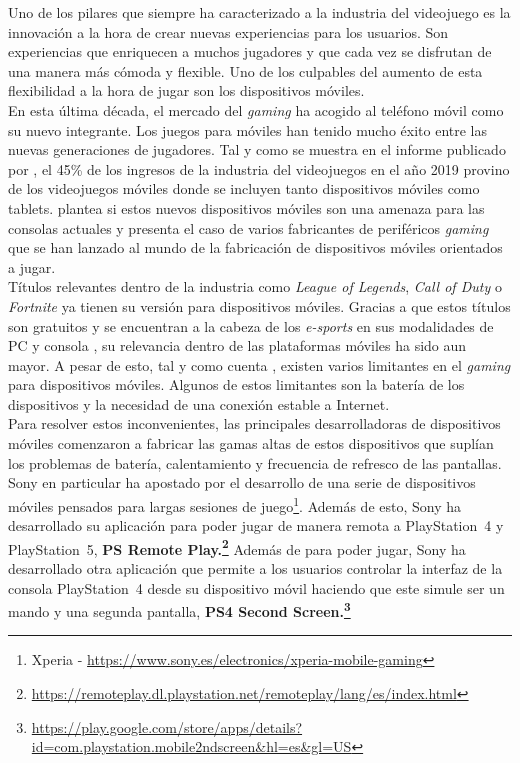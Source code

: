 Uno de los pilares que siempre ha caracterizado a la industria del videojuego es la innovaci\'on a la hora de crear nuevas experiencias para los usuarios. Son experiencias que enriquecen a muchos jugadores y que cada vez se disfrutan de una manera m\'as c\'omoda y flexible. Uno de los culpables del aumento de esta flexibilidad a la hora de jugar son los dispositivos m\'oviles. \\

En esta \'ultima d\'ecada, el mercado del \textit{gaming} ha acogido al tel\'efono m\'ovil como su nuevo integrante. Los juegos para m\'oviles han tenido mucho \'exito entre las nuevas generaciones de jugadores. Tal y como se muestra en el informe publicado por \cite{AEVI2019}, el 45\% de los ingresos de la industria del videojuegos en el a\~no 2019 provino de los videojuegos m\'oviles donde se incluyen tanto dispositivos m\'oviles como tablets. \cite{moviles} plantea si estos nuevos dispositivos m\'oviles son una amenaza para las consolas actuales y presenta el caso de varios fabricantes de perif\'ericos \textit{gaming} que se han lanzado al mundo de la fabricaci\'on de dispositivos m\'oviles orientados a jugar. \\

T\'itulos relevantes dentro de la industria como \textit{League of Legends}, \textit{Call of Duty} o \textit{Fortnite} ya tienen su versi\'on para dispositivos m\'oviles. Gracias a que estos t\'itulos son gratuitos y se encuentran a la cabeza de los \textit{e-sports} en sus modalidades de PC y consola \citep*{TEOQ32020}, su relevancia dentro de las plataformas m\'oviles ha sido aun mayor. A pesar de esto, tal y como cuenta \cite{futuro}, existen varios limitantes en el \textit{gaming} para dispositivos m\'oviles. Algunos de estos limitantes son la bater\'ia de los dispositivos y la necesidad de una conexi\'on estable a Internet.\\

Para resolver estos inconvenientes, las principales desarrolladoras de dispositivos m\'oviles comenzaron a fabricar las gamas altas de estos dispositivos que supl\'ian los problemas de bater\'ia, calentamiento y frecuencia de refresco de las pantallas. Sony en particular ha apostado por el desarrollo de una serie de dispositivos m\'oviles pensados para largas sesiones de juego\footnote{Xperia -  \url{https://www.sony.es/electronics/xperia-mobile-gaming}}. Adem\'as de esto, Sony ha desarrollado su aplicaci\'on para poder jugar de manera remota a PlayStation~4 y PlayStation~5, \textbf{PS Remote Play.\footnote{\url{https://remoteplay.dl.playstation.net/remoteplay/lang/es/index.html}}} Adem\'as de para poder jugar, Sony ha desarrollado otra aplicaci\'on que permite a los usuarios controlar la interfaz de la consola PlayStation~4 desde su dispositivo m\'ovil haciendo que este simule ser un mando y una segunda pantalla, \textbf{PS4 Second Screen.\footnote{\url{https://play.google.com/store/apps/details?id=com.playstation.mobile2ndscreen&hl=es&gl=US}}}\\

